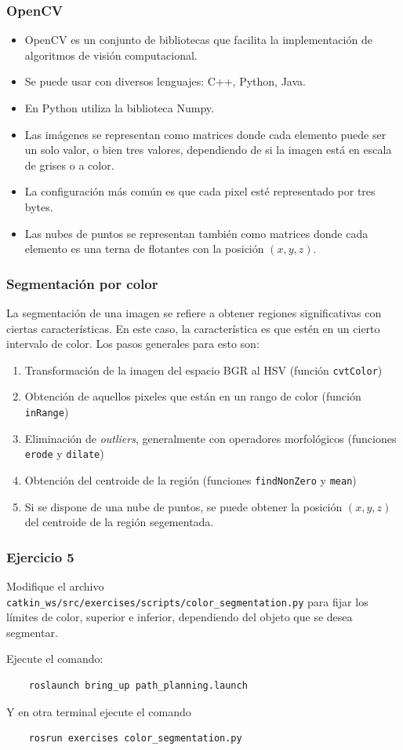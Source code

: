 \begin{frame}\frametitle{OpenCV}
  \begin{itemize}
  \item OpenCV es un conjunto de bibliotecas que facilita la implementación de algoritmos de visión computacional.
  \item Se puede usar con diversos lenguajes: C++, Python, Java.
  \item En Python utiliza la biblioteca Numpy.
  \item Las imágenes se representan como matrices donde cada elemento puede ser un solo valor, o bien tres valores, dependiendo de si la imagen está en escala de grises o a color.
  \item La configuración más común es que cada pixel esté representado por tres bytes.
  \item Las nubes de puntos se representan también como matrices donde cada elemento es una terna de flotantes con la posición $(x,y,z)$.
  \end{itemize}
\end{frame}

\begin{frame}\frametitle{Segmentación por color}
  La segmentación de una imagen se refiere a obtener regiones significativas con ciertas características. En este caso, la característica es que estén en un cierto intervalo de color. Los pasos generales para esto son:
  \begin{enumerate}
  \item Transformación de la imagen del espacio BGR al HSV (función \texttt{cvtColor})
  \item Obtención de aquellos pixeles que están en un rango de color (función \texttt{inRange})
  \item Eliminación de \textit{outliers}, generalmente con operadores morfológicos (funciones \texttt{erode} y \texttt{dilate})
  \item Obtención del centroide de la región (funciones \texttt{findNonZero} y \texttt{mean})
  \item Si se dispone de una nube de puntos, se puede obtener la posición $(x,y,z)$ del centroide de la región segementada. 
  \end{enumerate}
\end{frame}

\begin{frame}[containsverbatim]\frametitle{Ejercicio 5}
  Modifique el archivo \texttt{catkin\_ws/src/exercises/scripts/color\_segmentation.py} para fijar los límites de color, superior e inferior, dependiendo del objeto que se desea segmentar. 
  
  Ejecute el comando:
  \begin{lstlisting}
    roslaunch bring_up path_planning.launch
  \end{lstlisting}
  Y en otra terminal ejecute el comando
  \begin{lstlisting}
    rosrun exercises color_segmentation.py
  \end{lstlisting}
\end{frame}

